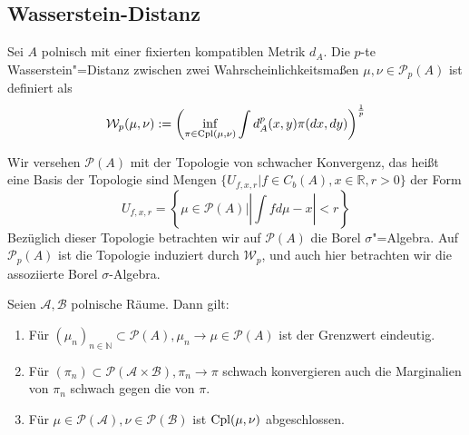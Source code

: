 \subsection{Wasserstein-Distanz}
\begin{definition}\label{def:wasserstein_distance}
    Sei $A$ polnisch mit einer fixierten kompatiblen Metrik $d_A$. Die $p$-te Wasserstein"=Distanz zwischen zwei Wahrscheinlichkeitsmaßen $\mu, \nu \in \mathcal{P}_p(A)$ ist definiert als
    $$\mathcal{W}_p(\mu, \nu) := \left( \inf_{\pi \in \operatorname{Cpl}(\mu, \nu)} \int d^p_A(x, y) \pi(dx, dy) \right)^\frac{1}{p}$$
\end{definition}
Wir versehen $\mathcal{P}(A)$ mit der Topologie von schwacher Konvergenz, das heißt eine Basis der Topologie sind Mengen $\{U_{f, x, r} \vert f \in C_b(A), x\in \mathbb{R}, r>0\}$ der Form 
$$U_{f, x, r} = \left\{ \mu \in \mathcal{P}(A) \vert \left| \int f d\mu - x\right| < r\right\}$$
Bezüglich dieser Topologie betrachten wir auf $\mathcal{P}(A)$ die Borel $\sigma$"=Algebra. Auf $\mathcal{P}_p(A)$ ist die Topologie induziert durch $\mathcal{W}_p$, und auch hier betrachten wir die assoziierte Borel $\sigma$-Algebra.
\begin{lemma}\label{thm:closed_couplings}
Seien $\mathcal{A,B}$ polnische Räume. Dann gilt: 
\begin{enumerate}
    \item Für $(\mu_n)_{n\in \mathbb{N}} \subset\mathcal{P}(A), \mu_n \rightarrow \mu \in \mathcal{P}(A)$ ist der Grenzwert eindeutig.
    \item Für $(\pi_n) \subset \mathcal{P}(\mathcal{A} \times \mathcal{B}), \pi_n \rightarrow \pi$ schwach konvergieren auch die Marginalien von $\pi_n$ schwach gegen die von $\pi$. 
    \item Für $\mu \in \mathcal{P}(\mathcal{A}), \nu \in \mathcal{P}(\mathcal{B})$ ist $\operatorname{Cpl}(\mu, \nu)$ abgeschlossen.
\end{enumerate}
\end{lemma}
